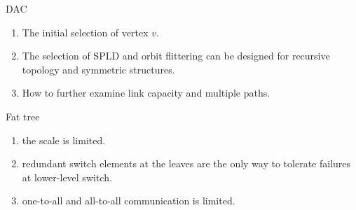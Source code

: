 \documentclass[journal,onecolumn,11pt]{IEEEtran}
\begin{document}
\cite{Chen:2010:GAA:1851182.1851190} DAC
\begin{enumerate}
  \item The initial selection of vertex $v$.
  \item The selection of SPLD and orbit flittering can be designed for recursive topology and symmetric structures.
  \item How to further examine link capacity and multiple paths.
\end{enumerate}

\cite{Al-Fares:2008:SCD:1402958.1402967} Fat tree
\begin{enumerate}
  \item the scale is limited.
  \item redundant switch elements at the leaves are the only way to tolerate failures at lower-level switch.
  \item one-to-all and all-to-all communication is limited.
\end{enumerate}
%
\end{document}
